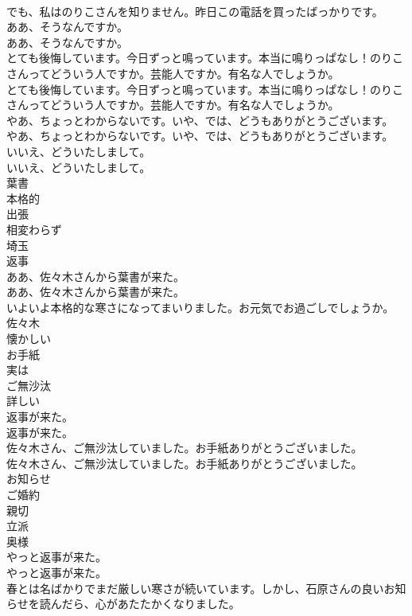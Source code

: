 \documentclass[8pt]{extreport}
\begin{document}
\begin{CJK}{UTF8}{min}
\\	でも、私はのりこさんを知りません。昨日この電話を買ったばっかりです。 
\\	ああ、そうなんですか。	
\\	ああ、そうなんですか。 
\\	とても後悔しています。今日ずっと鳴っています。本当に鳴りっぱなし！のりこさんってどういう人ですか。芸能人ですか。有名な人でしょうか。	
\\	とても後悔しています。今日ずっと鳴っています。本当に鳴りっぱなし！のりこさんってどういう人ですか。芸能人ですか。有名な人でしょうか。 
\\	やあ、ちょっとわからないです。いや、では、どうもありがとうございます。	
\\	やあ、ちょっとわからないです。いや、では、どうもありがとうございます。 
\\	いいえ、どういたしまして。	
\\	いいえ、どういたしまして。 
\\	葉書
\\	本格的
\\	出張
\\	相変わらず
\\	埼玉
\\	返事
\\	ああ、佐々木さんから葉書が来た。	
\\	ああ、佐々木さんから葉書が来た。 
\\	いよいよ本格的な寒さになってまいりました。お元気でお過ごしでしょうか。	
\\	佐々木	
\\	懐かしい
\\	お手紙
\\	実は
\\	ご無沙汰
\\	詳しい
\\	返事が来た。	
\\	返事が来た。 
\\	佐々木さん、ご無沙汰していました。お手紙ありがとうございました。	
\\	佐々木さん、ご無沙汰していました。お手紙ありがとうございました。 
\\	お知らせ
\\	ご婚約
\\	親切
\\	立派
\\	奥様
\\	やっと返事が来た。	
\\	やっと返事が来た。 
\\	春とは名ばかりでまだ厳しい寒さが続いています。しかし、石原さんの良いお知らせを読んだら、心があたたかくなりました。	

\end{CJK}
\end{document}
